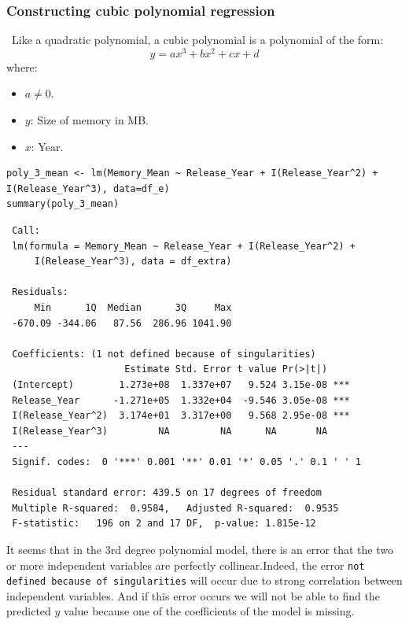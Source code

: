 \documentclass[a4paper]{article}
\begin{document}
\subsubsection{Constructing cubic polynomial regression}\
Like a quadratic polynomial, a cubic polynomial is a polynomial of the form:
\begin{equation*}
    y=ax^3+bx^2+cx+d
\end{equation*}
where:
\begin{itemize}
    \item $a \neq 0$.
    \item $y$: Size of memory in MB.
    \item $x$: Year.
\end{itemize}
\begin{mdframed}[leftline=false,rightline=false,backgroundcolor=lightblue!10,nobreak=false]
    \begin{verbatim}
poly_3_mean <- lm(Memory_Mean ~ Release_Year + I(Release_Year^2) + I(Release_Year^3), data=df_e)
summary(poly_3_mean)
    \end{verbatim}
\end{mdframed}
\begin{lstlisting}
 Call:
 lm(formula = Memory_Mean ~ Release_Year + I(Release_Year^2) + 
     I(Release_Year^3), data = df_extra)

 Residuals:
     Min      1Q  Median      3Q     Max 
 -670.09 -344.06   87.56  286.96 1041.90 

 Coefficients: (1 not defined because of singularities)
                     Estimate Std. Error t value Pr(>|t|)    
 (Intercept)        1.273e+08  1.337e+07   9.524 3.15e-08 ***
 Release_Year      -1.271e+05  1.332e+04  -9.546 3.05e-08 ***
 I(Release_Year^2)  3.174e+01  3.317e+00   9.568 2.95e-08 ***
 I(Release_Year^3)         NA         NA      NA       NA    
 ---
 Signif. codes:  0 '***' 0.001 '**' 0.01 '*' 0.05 '.' 0.1 ' ' 1

 Residual standard error: 439.5 on 17 degrees of freedom
 Multiple R-squared:  0.9584,	Adjusted R-squared:  0.9535 
 F-statistic:   196 on 2 and 17 DF,  p-value: 1.815e-12
\end{lstlisting}
It seems that in the 3rd degree polynomial model, there is an error that the two or more independent variables are perfectly collinear.Indeed, the error \texttt{not defined because of singularities} will occur due to strong correlation between independent variables. And if this error occurs we will not be able to find the predicted $y$ value because one of the coefficients of the model is missing.\\\\
\end{document}
